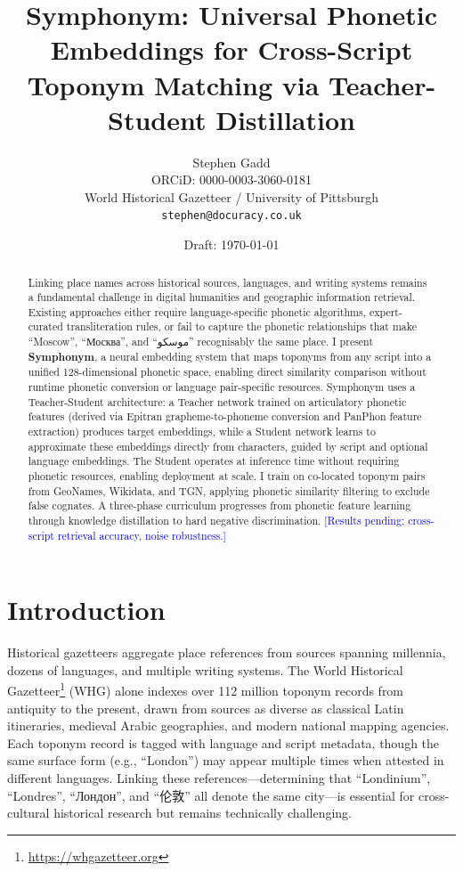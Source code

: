 \documentclass[11pt,a4paper]{article}
\title{Symphonym: Universal Phonetic Embeddings for Cross-Script Toponym Matching via Teacher-Student Distillation}
\author{
    Stephen Gadd \\
    {\small ORCiD: 0000-0003-3060-0181} \\
    World Historical Gazetteer / University of Pittsburgh \\
    \texttt{stephen@docuracy.co.uk}
}
\date{Draft: \today}
\newcommand{\textar}[1]{{\arabicfont #1}}
\newcommand{\textcn}[1]{{\chinesefont #1}}
\newcommand{\placeholder}[1]{\textcolor{blue}{[#1]}}
\newcommand{\embdim}{128}
\begin{document}
\maketitle

\begin{abstract}
Linking place names across historical sources, languages, and writing systems remains a fundamental challenge in digital humanities and geographic information retrieval. Existing approaches either require language-specific phonetic algorithms, expert-curated transliteration rules, or fail to capture the phonetic relationships that make ``Moscow'', ``Москва'', and ``\textar{موسکو}'' recognisably the same place. I present \textbf{Symphonym}, a neural embedding system that maps toponyms from any script into a unified \embdim-dimensional phonetic space, enabling direct similarity comparison without runtime phonetic conversion or language pair-specific resources. Symphonym uses a Teacher-Student architecture: a Teacher network trained on articulatory phonetic features (derived via Epitran grapheme-to-phoneme conversion and PanPhon feature extraction) produces target embeddings, while a Student network learns to approximate these embeddings directly from characters, guided by script and optional language embeddings. The Student operates at inference time without requiring phonetic resources, enabling deployment at scale. I train on co-located toponym pairs from GeoNames, Wikidata, and TGN, applying phonetic similarity filtering to exclude false cognates. A three-phase curriculum progresses from phonetic feature learning through knowledge distillation to hard negative discrimination. \placeholder{Results pending: cross-script retrieval accuracy, noise robustness.}
\end{abstract}

\section{Introduction}
\label{sec:introduction}

Historical gazetteers aggregate place references from sources spanning millennia, dozens of languages, and multiple writing systems. The World Historical Gazetteer\footnote{\url{https://whgazetteer.org}} (WHG) alone indexes over 112 million toponym records from antiquity to the present, drawn from sources as diverse as classical Latin itineraries, medieval Arabic geographies, and modern national mapping agencies. Each toponym record is tagged with language and script metadata, though the same surface form (e.g., ``London'') may appear multiple times when attested in different languages. Linking these references---determining that ``Londinium'', ``Londres'', ``Лондон'', and ``\textcn{伦敦}'' all denote the same city---is essential for cross-cultural historical research but remains technically challenging.
\end{document}
